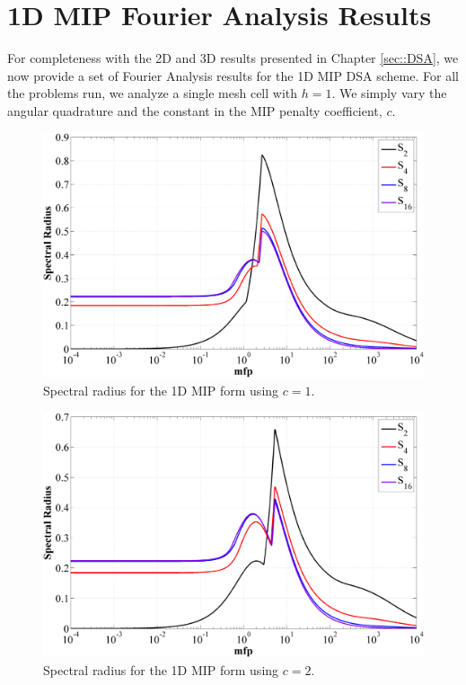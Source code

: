 \section{1D MIP Fourier Analysis Results}
\label{sec::App_DSA_resutls}

For completeness with the 2D and 3D results presented in Chapter \ref{sec::DSA}, we now provide a set of Fourier Analysis results for the 1D MIP DSA scheme. For all the problems run, we analyze a single mesh cell with $h=1$. We simply vary the angular quadrature and the constant in the MIP penalty coefficient, $c$.


\newpage
\begin{figure}
\label{fig::1D_MIP_c=1}
\centering
\includegraphics[width=\textwidth]{figures/appendices/DSA_1D_SI_MIP_C=1.png}
\caption{Spectral radius for the 1D MIP form using $c=1$.}
\end{figure}

\begin{figure}
\label{fig::1D_MIP_c=2}
\centering
\includegraphics[width=\textwidth]{figures/appendices/DSA_1D_SI_MIP_C=2.png}
\caption{Spectral radius for the 1D MIP form using $c=2$.}
\end{figure}

